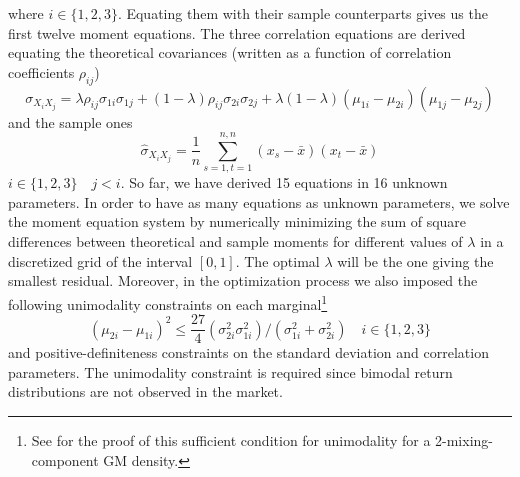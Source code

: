 where $i \in \{1,2,3\}$. Equating them with their sample counterparts gives us the first twelve moment equations. The three correlation equations are derived equating the theoretical covariances (written as a function of correlation coefficients $\rho_{ij}$)
\[ \sigma_{X_iX_j}= \lambda\rho_{ij}\sigma_{1i}\sigma_{1j}+(1-\lambda)\rho_{ij}\sigma_{2i}\sigma_{2j}+\lambda(1-\lambda)(\mu_{1i}-\mu_{2i})(\mu_{1j}-\mu_{2j})   \] and the sample ones \[ \widehat{\sigma}_{X_iX_j} = \frac{1}{n}\sum_{s=1,t=1}^{n,n}(x_s-\bar{x})(x_t-\bar{x})
\]
 $i \in \{1,2,3\} \quad j<i.$ So far, we have derived 15 equations in 16 unknown parameters. In order to have as many equations as unknown parameters, we solve the moment equation system by numerically minimizing the sum of square differences between theoretical and sample moments for different values of $\lambda$ in a discretized grid of the interval $[0,1]$. The optimal $\lambda$ will be the one giving the smallest residual. Moreover, in the optimization process we also imposed the following unimodality constraints on each marginal\footnote{See \cite{Eisenberg64} for the proof of this sufficient condition for unimodality for a 2-mixing-component GM density.}
 \[ (\mu_{2i} - \mu_{1i})^2 \leq \frac{27}{4}(\sigma^2_{2i}\sigma^2_{1i})/(\sigma^2_{1i}+\sigma^2_{2i}) \quad i \in \{1,2,3\}\]
 and positive-definiteness constraints on the standard deviation and correlation parameters. The unimodality constraint is required  since bimodal return distributions are not observed in the market.

